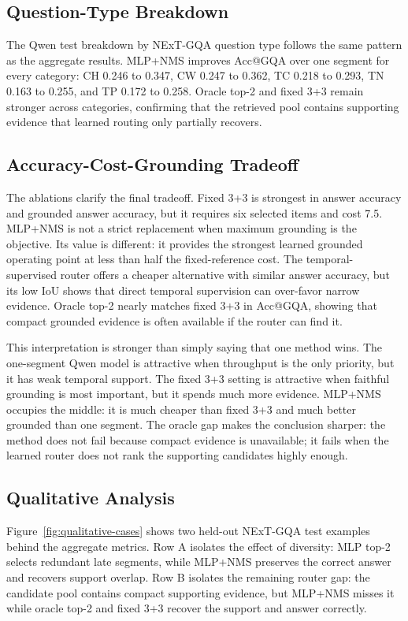 \documentclass{article}
\begin{document}
\subsection{Question-Type Breakdown}
The Qwen test breakdown by NExT-GQA question type follows the same pattern as the aggregate results. MLP+NMS improves Acc@GQA over one segment for every category: CH 0.246 to 0.347, CW 0.247 to 0.362, TC 0.218 to 0.293, TN 0.163 to 0.255, and TP 0.172 to 0.258. Oracle top-2 and fixed 3+3 remain stronger across categories, confirming that the retrieved pool contains supporting evidence that learned routing only partially recovers.

\subsection{Accuracy-Cost-Grounding Tradeoff}
The ablations clarify the final tradeoff. Fixed 3+3 is strongest in answer accuracy and grounded answer accuracy, but it requires six selected items and cost 7.5. MLP+NMS is not a strict replacement when maximum grounding is the objective. Its value is different: it provides the strongest learned grounded operating point at less than half the fixed-reference cost. The temporal-supervised router offers a cheaper alternative with similar answer accuracy, but its low IoU shows that direct temporal supervision can over-favor narrow evidence. Oracle top-2 nearly matches fixed 3+3 in Acc@GQA, showing that compact grounded evidence is often available if the router can find it.

This interpretation is stronger than simply saying that one method wins. The one-segment Qwen model is attractive when throughput is the only priority, but it has weak temporal support. The fixed 3+3 setting is attractive when faithful grounding is most important, but it spends much more evidence. MLP+NMS occupies the middle: it is much cheaper than fixed 3+3 and much better grounded than one segment. The oracle gap makes the conclusion sharper: the method does not fail because compact evidence is unavailable; it fails when the learned router does not rank the supporting candidates highly enough.

\subsection{Qualitative Analysis}
Figure~\ref{fig:qualitative-cases} shows two held-out NExT-GQA test examples behind the aggregate metrics. Row A isolates the effect of diversity: MLP top-2 selects redundant late segments, while MLP+NMS preserves the correct answer and recovers support overlap. Row B isolates the remaining router gap: the candidate pool contains compact supporting evidence, but MLP+NMS misses it while oracle top-2 and fixed 3+3 recover the support and answer correctly.
\end{document}
